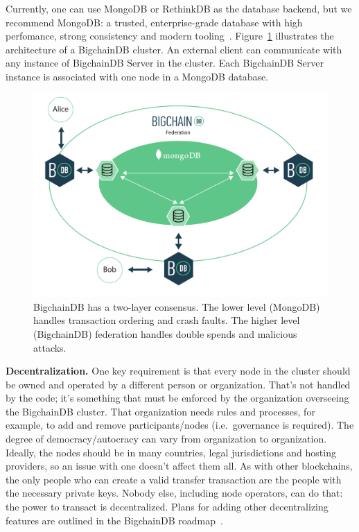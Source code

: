 \documentclass[a4paper]{article}
\begin{document}
Currently, one can use MongoDB or RethinkDB as the database backend,
but we recommend MongoDB:
a trusted, enterprise-grade database with
high perfomance, strong consistency and modern tooling~\cite{mongodb}.
Figure~\ref{fig:system_diagram} illustrates the architecture
of a BigchainDB cluster.
An external client can communicate with any instance of BigchainDB Server
in the cluster.
Each BigchainDB Server instance is associated with one node
in a MongoDB database.


\begin{figure}[!ht]
  \centering
  \includegraphics[width=\textwidth]{MDB_BDB_ellipses.pdf}
  \caption{BigchainDB has a two-layer consensus. The lower level (MongoDB) handles transaction ordering and crash faults. The higher level (BigchainDB) federation handles double spends and malicious attacks.}
  \label{fig:system_diagram}
\end{figure}


\noindent \textbf{Decentralization.}
One key requirement is that every node in the cluster should be owned and operated
by a different person or organization.
That's not handled by the code;
it's something that must be enforced by the organization overseeing
the BigchainDB cluster.
That organization needs rules and processes, for example,
to add and remove participants/nodes (i.e.~governance is required).
The degree of democracy/autocracy can vary from organization to organization.
Ideally, the nodes should be in many countries, legal jurisdictions and hosting providers,
so an issue with one doesn't affect them all.
As with other blockchains,
the only people who can create a valid transfer transaction
are the people with the necessary private keys.
Nobody else, including node operators, can do that:
the power to transact is decentralized.
Plans for adding other decentralizing features
are outlined in the BigchainDB roadmap~\cite{bigchaindb_roadmap}.
\end{document}
